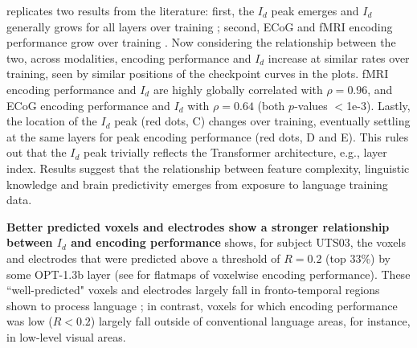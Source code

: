 \documentclass{article}
\theoremstyle{plain}
\theoremstyle{definition}
\theoremstyle{remark}
\newcommand{\mypar}[1]{\textbf{#1}\quad}
\begin{document}
 replicates two results from the literature: first, the $I_d$ peak emerges and $I_d$ generally grows for all layers over training \citep{cheng2025emergence}; second, ECoG and fMRI encoding performance grow over training \citep{alkhamissi-etal-2025-language}. Now considering the relationship between the two, across modalities, encoding performance and $I_d$ increase at similar rates over training, seen by similar positions of the checkpoint curves in the plots. fMRI encoding performance and $I_d$ are highly globally correlated with $\rho = 0.96$, and ECoG encoding performance and $I_d$ with $\rho=0.64$ (both $p$-values $<$1e-3). Lastly, the location of the $I_d$ peak (red dots, C) changes over training, eventually settling at the same layers for peak encoding performance (red dots, D and E). This rules out that the $I_d$ peak trivially reflects the Transformer architecture, e.g., layer index. Results suggest that the relationship between feature complexity, linguistic knowledge and brain predictivity emerges from exposure to language training data.

\mypar{Better predicted voxels and electrodes show a stronger relationship between $I_d$ and encoding performance} 
 shows, for subject UTS03, the voxels and electrodes that were predicted above a threshold of $R=0.2$ (top 33\%) by some OPT-1.3b layer (see  for flatmaps of voxelwise encoding performance). These ``well-predicted" voxels and electrodes largely fall in fronto-temporal regions shown to process language \citep{Fedorenko_Ivanova_Regev_2024}; in contrast, voxels for which encoding performance was low ($R<0.2$) largely fall outside of conventional language areas, for instance, in low-level visual areas. 
\end{document}

